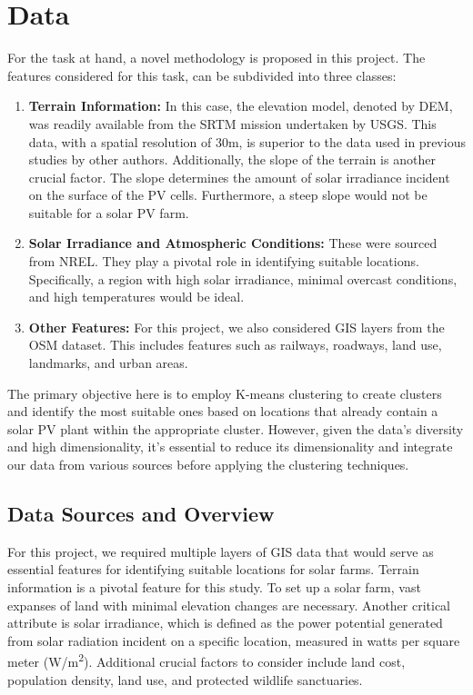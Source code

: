 \documentclass[a4paper,12pt]{Classes/RoboticsLaTeX}
\begin{document}
	\chapter{Data}
	\label{chap:methodology}

	For the task at hand, a novel methodology is proposed in this project. The features considered for this task, 
	can be subdivided into three classes:

	\begin{enumerate}
		\item \textbf{Terrain Information:} In this case, the elevation model, denoted by \ac{DEM}, was readily available from the \ac{SRTM} mission undertaken by \ac{USGS}. This data, with a spatial resolution of 30m, is superior to the data used in previous studies by other authors. Additionally, the slope of the terrain is another crucial factor. The slope determines the amount of solar irradiance incident on the surface of the \ac{PV} cells. Furthermore, a steep slope would not be suitable for a solar \ac{PV} farm.
		
		\item \textbf{Solar Irradiance and Atmospheric Conditions:} These were sourced from \ac{NREL}. They play a pivotal role in identifying suitable locations. Specifically, a region with high solar irradiance, minimal overcast conditions, and high temperatures would be ideal.
		
		\item \textbf{Other Features:} For this project, we also considered \ac{GIS} layers from the \ac{OSM} dataset. This includes features such as railways, roadways, land use, landmarks, and urban areas.
	\end{enumerate}
	
	The primary objective here is to employ K-means clustering to create clusters and identify the most suitable ones based on locations that already contain a solar PV plant within the appropriate cluster. 
	However, given the data's diversity and high dimensionality, it's essential to reduce its dimensionality and integrate our data from various sources before applying the clustering techniques.

	\section{Data Sources and Overview}

	For this project, we required multiple layers of GIS data that would serve as essential features for identifying suitable locations for solar farms. 
	Terrain information is a pivotal feature for this study. To set up a solar farm, vast expanses of land with minimal elevation changes are necessary. 
	Another critical attribute is solar irradiance, which is defined as the power potential generated from solar radiation incident on a specific location, 
	measured in watts per square meter (W/m\textsuperscript{2}). Additional crucial factors to consider include land cost, population density, land use, and 
	protected wildlife sanctuaries.
\end{document}
